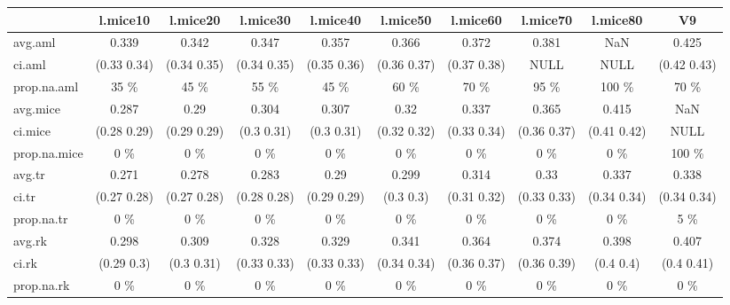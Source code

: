 \begin{table}[ht]
\centering
\begin{tabular}{|l|c|c|c|c|c|c|c|c|c|}
  \hline
 & l.mice10 & l.mice20 & l.mice30 & l.mice40 & l.mice50 & l.mice60 & l.mice70 & l.mice80 & V9 \\ 
  \hline
avg.aml & 0.339 & 0.342 & 0.347 & 0.357 & 0.366 & 0.372 & 0.381 & NaN & 0.425 \\ 
  ci.aml & (0.33 0.34) & (0.34 0.35) & (0.34 0.35) & (0.35 0.36) & (0.36 0.37) & (0.37 0.38) & NULL & NULL & (0.42 0.43) \\ 
  prop.na.aml & 35 \% & 45 \% & 55 \% & 45 \% & 60 \% & 70 \% & 95 \% & 100 \% & 70 \% \\ 
  avg.mice & 0.287 & 0.29 & 0.304 & 0.307 & 0.32 & 0.337 & 0.365 & 0.415 & NaN \\ 
  ci.mice & (0.28 0.29) & (0.29 0.29) & (0.3 0.31) & (0.3 0.31) & (0.32 0.32) & (0.33 0.34) & (0.36 0.37) & (0.41 0.42) & NULL \\ 
  prop.na.mice & 0 \% & 0 \% & 0 \% & 0 \% & 0 \% & 0 \% & 0 \% & 0 \% & 100 \% \\ 
  avg.tr & 0.271 & 0.278 & 0.283 & 0.29 & 0.299 & 0.314 & 0.33 & 0.337 & 0.338 \\ 
  ci.tr & (0.27 0.28) & (0.27 0.28) & (0.28 0.28) & (0.29 0.29) & (0.3 0.3) & (0.31 0.32) & (0.33 0.33) & (0.34 0.34) & (0.34 0.34) \\ 
  prop.na.tr & 0 \% & 0 \% & 0 \% & 0 \% & 0 \% & 0 \% & 0 \% & 0 \% & 5 \% \\ 
  avg.rk & 0.298 & 0.309 & 0.328 & 0.329 & 0.341 & 0.364 & 0.374 & 0.398 & 0.407 \\ 
  ci.rk & (0.29 0.3) & (0.3 0.31) & (0.33 0.33) & (0.33 0.33) & (0.34 0.34) & (0.36 0.37) & (0.36 0.39) & (0.4 0.4) & (0.4 0.41) \\ 
  prop.na.rk & 0 \% & 0 \% & 0 \% & 0 \% & 0 \% & 0 \% & 0 \% & 0 \% & 0 \% \\ 
   \hline
\end{tabular}
\end{table}

